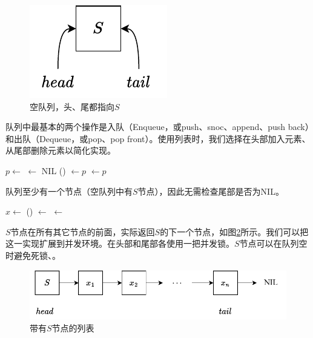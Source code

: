 \documentclass[b5paper]{ctexart}
\begin{document}
\begin{figure}[htbp]
  \centering
  \includegraphics[scale=0.6]{img/empty-list}
  \caption{空队列，头、尾都指向$S$}
  \label{fig:empty-list}
\end{figure}

队列中最基本的两个操作是入队（Enqueue，或push、snoc、append、push back）和出队（Dequeue，或pop、pop front）。使用列表时，我们选择在头部加入元素、从尾部删除元素以简化实现。

\begin{algorithmic}[1]
  \State $p \gets $ 
  \State {} $\gets$ NIL
  \State {}() $\gets p$
  \State {} $\gets p$
\EndFunction
\end{algorithmic}

队列至少有一个节点（空队列中有$S$节点），因此无需检查尾部是否为NIL。

\begin{algorithmic}[1]
  \State $x \gets $ 
  \State {}() $\gets$ 
   
    \State {} $\gets$ 
  \EndIf
  \State \Return {}
\EndFunction
\end{algorithmic}

$S$节点在所有其它节点的前面，实际返回$S$的下一个节点，如图\ref{fig:list-queue}所示。我们可以把这一实现扩展到并发环境。在头部和尾部各使用一把并发锁。$S$节点可以在队列空时避免死锁\cite{PODC96}、\cite{SutterDDJ}。

\begin{figure}[htbp]
  \centering
  \includegraphics[scale=0.8]{img/slistq}
  \caption{带有$S$节点的列表}
  \label{fig:list-queue}
\end{figure}
\end{document}
